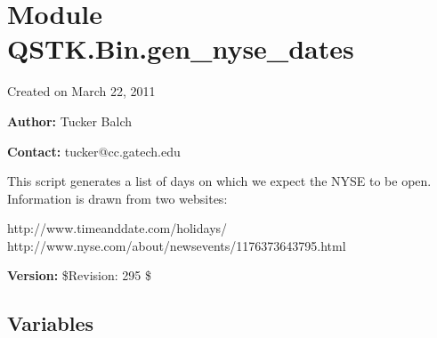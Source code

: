 %
%
%


\section{Module QSTK.Bin.gen\_nyse\_dates}

    \label{QSTK:Bin:gen_nyse_dates}
Created on March 22, 2011

\textbf{Author:} Tucker Balch



\textbf{Contact:} tucker@cc.gatech.edu

This script generates a list of days on which we expect the NYSE to be 
open.  Information is drawn from two websites:

http://www.timeanddate.com/holidays/ 
http://www.nyse.com/about/newsevents/1176373643795.html



\textbf{Version:} \$Revision: 295 \$





  \subsection{Variables}

